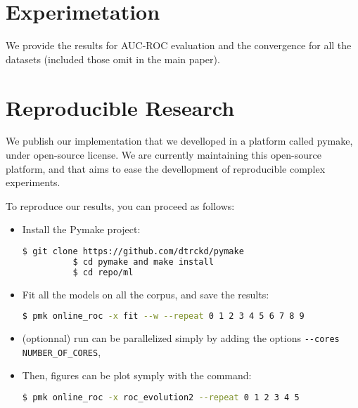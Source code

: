 \section{Experimetation}

We provide the results for AUC-ROC evaluation and the convergence for all the datasets (included those omit in the main paper).

\begin{figure}[h]
\centering
	
   \label{fig:roc}
\end{figure}


\begin{figure}[h]
\centering
	
    \label{fig:conv_entropy}
\end{figure}

\section{Reproducible Research}

We publish our implementation that we develloped in a platform called pymake, under open-source license. We are currently maintaining this open-source platform, and that aims to ease the devellopment of reproducible complex experiments. 

To reproduce our results, you can proceed as follows:
\begin{itemize}
\item Install the Pymake project:   %
    \begin{lstlisting}[language=bash]
          $ git clone https://github.com/dtrckd/pymake
          $ cd pymake and make install
          $ cd repo/ml
    \end{lstlisting}
\item Fit all the models on all the corpus, and save the results:
\begin{lstlisting}[language=bash]
        $ pmk online_roc -x fit --w --repeat 0 1 2 3 4 5 6 7 8 9 
\end{lstlisting}
\item (optionnal) run can be parallelized simply by adding the options \lstinline|--cores NUMBER_OF_CORES|,
\item Then, figures can be plot symply with the command:  
\begin{lstlisting}[language=bash]
        $ pmk online_roc -x roc_evolution2 --repeat 0 1 2 3 4 5
\end{lstlisting}
\end{itemize}

